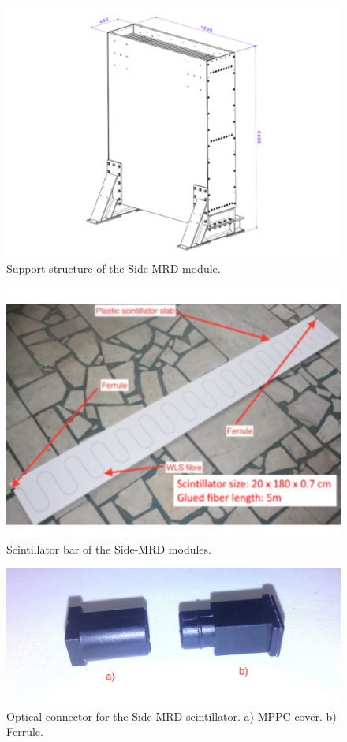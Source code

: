 \begin{figure}[tbh]
\begin{center}
\includegraphics[width=0.8\linewidth]{fig/side_mrd_structure.pdf}
\end{center}
\caption{
Support structure of the Side-MRD module.
}
\label{fig:side_mrd_support_structure}
\end{figure}

\begin{figure}[tbh]
\begin{center}
\includegraphics[width=0.8\linewidth]{fig/side_mrd_scintillator.pdf}
\end{center}
\caption{
Scintillator bar of the Side-MRD modules.
}
\label{fig:side_mrd_scintillator}
\end{figure}

\begin{figure}[tbh]
\begin{center}
\includegraphics[width=0.8\linewidth]{fig/side_mrd_optical_con.jpg}
\end{center}
\caption{
Optical connector for the Side-MRD scintillator. a) MPPC cover. b) Ferrule.
}
\label{fig:side_mrd_optical_con}
\end{figure}

